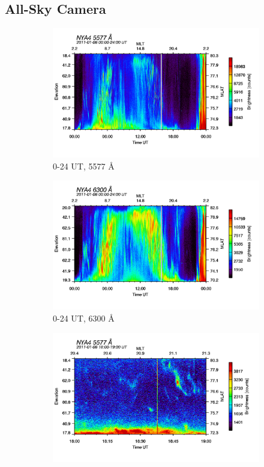 \documentclass[10pt,a4paper]{article}
\begin{document}
\subsection{All-Sky Camera}








\begin{figure}[h]
	\begin{subfigure}{.5\textwidth}
		\centering
		\includegraphics[width=.8\linewidth]{am-0024-5577.png}
		\caption{0-24 UT, 5577 Å}
		\label{fig:sfig1}
	\end{subfigure}
	\begin{subfigure}{.5\textwidth}
		\centering
		\includegraphics[width=.8\linewidth]{am-0024-6300.png}
		\caption{0-24 UT, 6300 Å}
		\label{fig:sfig2}
	\end{subfigure}
	\begin{subfigure}{.5\textwidth}
		\centering
		\includegraphics[width=.8\linewidth]{am-1819-5577.png}

\end{subfigure}
\end{figure}
\end{document}
